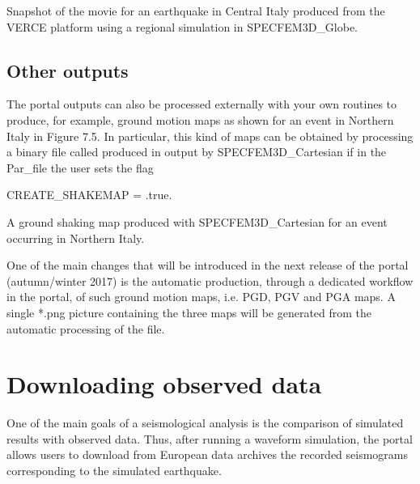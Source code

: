\documentclass[english]{book}
\begin{document}

 Snapshot of the movie for an earthquake in Central
Italy produced from the VERCE platform using a regional simulation in
SPECFEM3D\_Globe.


\subsection{Other outputs}
\label{\detokenize{Section7:other-outputs}}
The portal outputs can also be processed externally with your own
routines to produce, for example, ground motion maps as shown for an
event in Northern Italy in Figure 7.5. In particular, this kind of maps
can be obtained by processing a binary file called 
produced in output by SPECFEM3D\_Cartesian if in the Par\_file the user
sets the flag

CREATE\_SHAKEMAP = .true.


 A ground shaking map produced with SPECFEM3D\_Cartesian
for an event occurring in Northern Italy.

One of the main changes that will be introduced in the next release of
the portal (autumn/winter 2017) is the automatic production, through a
dedicated workflow in the portal, of such ground motion maps, i.e. PGD,
PGV and PGA maps. A single *.png picture containing the three maps will
be generated from the automatic processing of the  file.


\section{Downloading observed data}
\label{\detokenize{Section7:downloading-observed-data}}
One of the main goals of a seismological analysis is the comparison of
simulated results with observed data. Thus, after running a waveform
simulation, the portal allows users to download from European data
archives the recorded seismograms corresponding to the simulated
earthquake.
\end{document}
